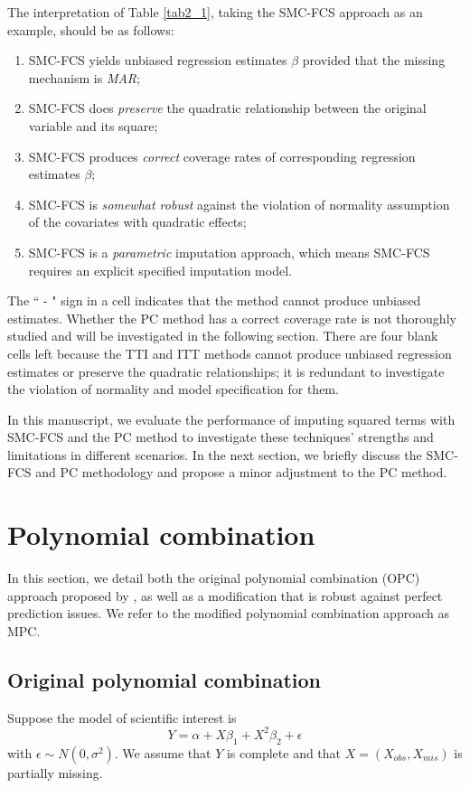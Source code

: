 	The interpretation of Table \ref{tab2_1}, taking the SMC-FCS approach as an example, should be as follows:
	\begin{enumerate}
		\item SMC-FCS yields unbiased regression estimates $\beta$ provided that the missing mechanism is \emph{MAR};
		\item SMC-FCS does \emph{preserve} the quadratic relationship between the original variable and its square;
		\item SMC-FCS produces \emph{correct} coverage rates of corresponding regression estimates $\beta$; 
		\item SMC-FCS is \emph{somewhat robust} against the violation of normality assumption of the covariates with quadratic effects;
		\item SMC-FCS is a \emph{parametric} imputation approach, which means SMC-FCS requires an explicit specified imputation model. 
	\end{enumerate}
	The `` - " sign in a cell indicates that the method cannot produce unbiased estimates. Whether the PC method has a correct coverage rate is not thoroughly studied and will be investigated in the following section. There are four blank cells left because the TTI and ITT methods cannot produce unbiased regression estimates or preserve the quadratic relationships; it is redundant to investigate the violation of normality and model specification for them.    
	
	In this manuscript, we evaluate the performance of imputing squared terms with SMC-FCS and the PC method to investigate these techniques' strengths and limitations in different scenarios. In the next section, we briefly discuss the SMC-FCS and PC methodology and propose a minor adjustment to the PC method.
	
	\section{Polynomial combination}
	In this section, we detail both the original polynomial combination (OPC) approach proposed by \citet{Vink2013}, as well as a modification that is robust against perfect prediction issues. We refer to the modified polynomial combination approach as MPC. 
	\subsection{Original polynomial combination}
	Suppose the model of scientific interest is 
	\begin{equation}
		Y = \alpha + X\beta_{1} + X^2\beta_{2} +\epsilon
		\label{eqn2_1}
	\end{equation}
	with $\epsilon \sim N(0, \sigma^2)$. We assume that $Y$ is complete and that $X = (X_{obs}, X_{mis})$ is partially missing. 
	
